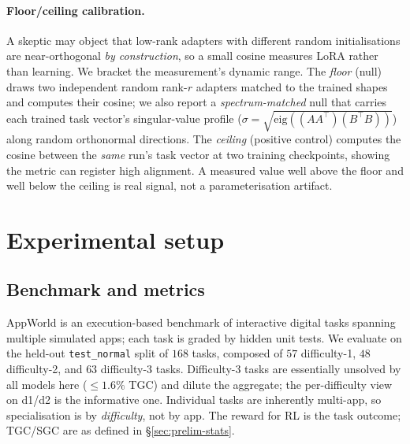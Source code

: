 \documentclass[11pt]{article}
\begin{document}
\paragraph{Floor/ceiling calibration.} A skeptic may object that low-rank adapters with
different random initialisations are near-orthogonal \emph{by construction}, so a small
cosine measures LoRA rather than learning. We bracket the measurement's dynamic range.
The \emph{floor} (null) draws two independent random rank-$r$ adapters matched to the
trained shapes and computes their cosine; we also report a \emph{spectrum-matched} null
that carries each trained task vector's singular-value profile
($\sigma=\sqrt{\mathrm{eig}((AA^{\!\top})(B^{\!\top}B))}$) along random orthonormal
directions. The \emph{ceiling} (positive control) computes the cosine between the
\emph{same} run's task vector at two training checkpoints, showing the metric can register
high alignment. A measured value well above the floor and well below the ceiling is real
signal, not a parameterisation artifact.

\section{Experimental setup}
\label{sec:setup}

\subsection{Benchmark and metrics}
\label{sec:setup-bench}
AppWorld \citep{trivedi2024appworld} is an execution-based benchmark of interactive
digital tasks spanning multiple simulated apps; each task is graded by hidden unit tests.
We evaluate on the held-out \texttt{test\_normal} split of $168$ tasks, composed of
$57$ difficulty-1, $48$ difficulty-2, and $63$ difficulty-3 tasks. Difficulty-3 tasks are
essentially unsolved by all models here ($\le1.6\%$ TGC) and dilute the aggregate; the
per-difficulty view on d1/d2 is the informative one. Individual tasks are inherently
multi-app, so specialisation is by \emph{difficulty}, not by app. The reward for RL is the
task outcome; TGC/SGC are as defined in \S\ref{sec:prelim-stats}.
\end{document}
